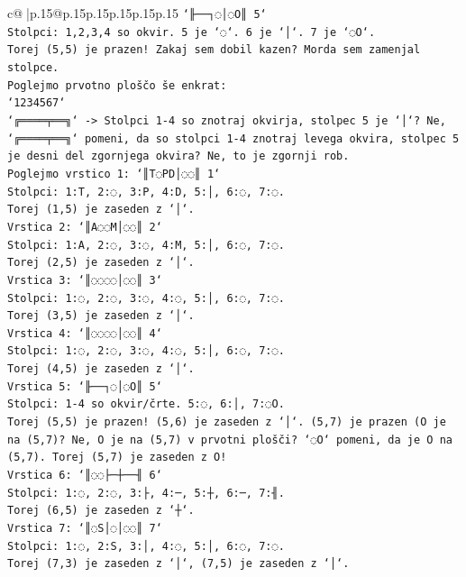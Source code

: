 \documentclass{article}
\begin{document}
{\begin{supertabular}{c@{$\;$}|p{.15\linewidth}@{}p{.15\linewidth}p{.15\linewidth}p{.15\linewidth}p{.15\linewidth}p{.15\linewidth}}
{{{\texttt{`╟──┐◌│◌O║ 5`} \\
\texttt{Stolpci: 1,2,3,4 so okvir. 5 je `◌`. 6 je `│`. 7 je `◌O`.} \\
\texttt{Torej (5,5) je prazen! Zakaj sem dobil kazen? Morda sem zamenjal stolpce.} \\
\texttt{Poglejmo prvotno ploščo še enkrat:} \\
\texttt{`1234567`} \\
\texttt{`╔════╤══╗` {-}> Stolpci 1{-}4 so znotraj okvirja, stolpec 5 je `│`? Ne, `╔════╤══╗` pomeni, da so stolpci 1{-}4 znotraj levega okvira, stolpec 5 je desni del zgornjega okvira? Ne, to je zgornji rob.} \\
\texttt{Poglejmo vrstico 1: `║T◌PD│◌◌║ 1`} \\
\texttt{Stolpci: 1:T, 2:◌, 3:P, 4:D, 5:│, 6:◌, 7:◌.} \\
\texttt{Torej (1,5) je zaseden z `│`.} \\
\texttt{Vrstica 2: `║A◌◌M│◌◌║ 2`} \\
\texttt{Stolpci: 1:A, 2:◌, 3:◌, 4:M, 5:│, 6:◌, 7:◌.} \\
\texttt{Torej (2,5) je zaseden z `│`.} \\
\texttt{Vrstica 3: `║◌◌◌◌│◌◌║ 3`} \\
\texttt{Stolpci: 1:◌, 2:◌, 3:◌, 4:◌, 5:│, 6:◌, 7:◌.} \\
\texttt{Torej (3,5) je zaseden z `│`.} \\
\texttt{Vrstica 4: `║◌◌◌◌│◌◌║ 4`} \\
\texttt{Stolpci: 1:◌, 2:◌, 3:◌, 4:◌, 5:│, 6:◌, 7:◌.} \\
\texttt{Torej (4,5) je zaseden z `│`.} \\
\texttt{Vrstica 5: `╟──┐◌│◌O║ 5`} \\
\texttt{Stolpci: 1{-}4 so okvir/črte. 5:◌, 6:│, 7:◌O.} \\
\texttt{Torej (5,5) je prazen! (5,6) je zaseden z `│`. (5,7) je prazen (O je na (5,7)? Ne, O je na (5,7) v prvotni plošči? `◌O` pomeni, da je O na (5,7). Torej (5,7) je zaseden z O!} \\
\texttt{Vrstica 6: `║◌◌├─┼──╢ 6`} \\
\texttt{Stolpci: 1:◌, 2:◌, 3:├, 4:─, 5:┼, 6:─, 7:╢.} \\
\texttt{Torej (6,5) je zaseden z `┼`.} \\
\texttt{Vrstica 7: `║◌S│◌│◌◌║ 7`} \\
\texttt{Stolpci: 1:◌, 2:S, 3:│, 4:◌, 5:│, 6:◌, 7:◌.} \\
\texttt{Torej (7,3) je zaseden z `│`, (7,5) je zaseden z `│`.} \\
}}}
\end{supertabular}}
\end{document}
